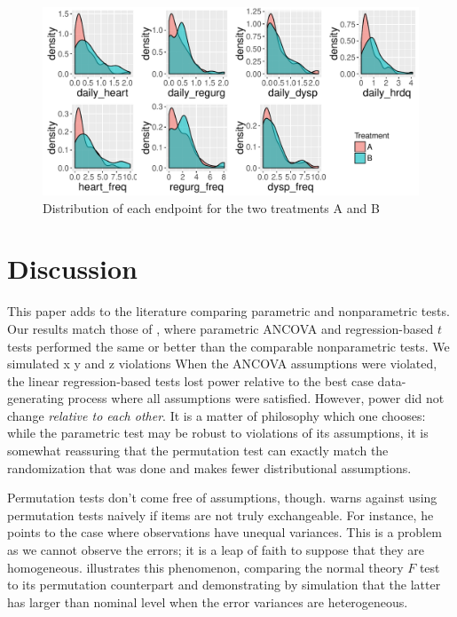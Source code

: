 \documentclass[11pt]{article}
\begin{document}
\begin{figure}
\centering
\includegraphics[width = \textwidth]{fig/clinical_distr}
\caption{Distribution of each endpoint for the two treatments A and B}
\label{fig:clinical_distr}
\end{figure}


\begin{center}

\end{center}

\section*{Discussion}

This paper adds to the literature comparing parametric and nonparametric tests.
Our results match those of \cite{vickers_parametric_2005, anderson_empirical_1999}, where parametric ANCOVA and regression-based $t$ tests performed the same or better than the comparable nonparametric tests.
We simulated x y and z violations
When the ANCOVA assumptions were violated, the linear regression-based tests lost power relative to the best case data-generating process where all assumptions were satisfied.
However, power did not change \textit{relative to each other}.
It is a matter of philosophy which one chooses: while the parametric test may be robust to violations of its assumptions, it is somewhat reassuring that the permutation test can exactly match the randomization that was done and makes fewer distributional assumptions.

Permutation tests don't come free of assumptions, though.  \cite{romano_behavior_1990} warns against using permutation tests naively if items are not truly exchangeable. 
For instance, he points to the case where observations have unequal variances.  
This is a problem as we cannot observe the errors; it is a leap of faith to suppose that they are homogeneous.
\cite{boik_fisherpitman_1987} illustrates this phenomenon, comparing the normal theory $F$ test to its permutation counterpart and demonstrating by simulation that the latter has larger than nominal level when the error variances are heterogeneous.
\end{document}
